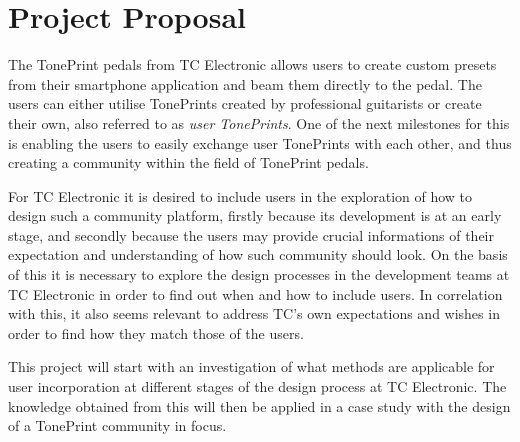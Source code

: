 \chapter{Project Proposal}
\label{ProjectProposal}

The TonePrint pedals from TC Electronic allows users to create custom presets from their smartphone application and beam them directly to the pedal. The users can either utilise TonePrints created by professional guitarists or create their own, also referred to as \textit{user TonePrints}. One of the next milestones for this is enabling the users to easily exchange user TonePrints with each other, and thus creating a community within the field of TonePrint pedals.

For TC Electronic it is desired to include users in the exploration of how to design such a community platform, firstly because its development is at an early stage, and secondly because the users may provide crucial informations of their expectation and understanding of how such community should look. On the basis of this it is necessary to explore the design processes in the development teams at TC Electronic in order to find out when and how to include users. In correlation with this, it also seems relevant to address TC's own expectations and wishes in order to find how they match those of the users.

This project will start with an investigation of what methods are applicable for user incorporation at different stages of the design process at TC Electronic. The knowledge obtained from this will then be applied in a case study with the design of a TonePrint community in focus.
